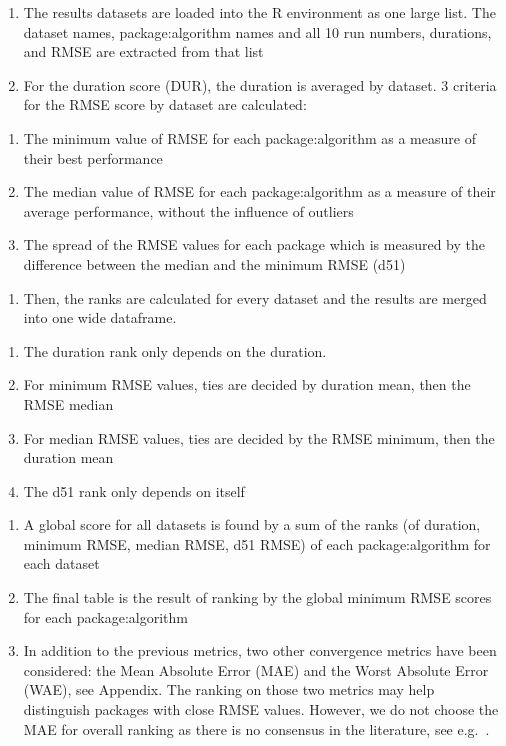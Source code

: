 \begin{enumerate}
\def\labelenumi{\arabic{enumi}.}
\tightlist
\item
  The results datasets are loaded into the R environment as one large
  list. The dataset names, package:algorithm names and all 10 run
  numbers, durations, and RMSE are extracted from that list
\item
  For the duration score (DUR), the duration is averaged by dataset. 3
  criteria for the RMSE score by dataset are calculated:
\end{enumerate}

\begin{enumerate}
\def\labelenumi{\alph{enumi}.}
\tightlist
\item
  The minimum value of RMSE for each package:algorithm as a measure of
  their best performance
\item
  The median value of RMSE for each package:algorithm as a measure of
  their average performance, without the influence of outliers
\item
  The spread of the RMSE values for each package which is measured by
  the difference between the median and the minimum RMSE (d51)
\end{enumerate}

\begin{enumerate}
\def\labelenumi{\arabic{enumi}.}
\setcounter{enumi}{2}
\tightlist
\item
  Then, the ranks are calculated for every dataset and the results are
  merged into one wide dataframe.
\end{enumerate}

\begin{enumerate}
\def\labelenumi{\alph{enumi}.}
\tightlist
\item
  The duration rank only depends on the duration.
\item
  For minimum RMSE values, ties are decided by duration mean, then the
  RMSE median
\item
  For median RMSE values, ties are decided by the RMSE minimum, then the
  duration mean
\item
  The d51 rank only depends on itself
\end{enumerate}

\begin{enumerate}
\def\labelenumi{\arabic{enumi}.}
\setcounter{enumi}{3}
\tightlist
\item
  A global score for all datasets is found by a sum of the ranks (of
  duration, minimum RMSE, median RMSE, d51 RMSE) of each
  package:algorithm for each dataset
\item
  The final table is the result of ranking by the global minimum RMSE
  scores for each package:algorithm
\item
  In addition to the previous metrics, two other convergence metrics
  have been considered: the Mean Absolute Error (MAE) and the Worst
  Absolute Error (WAE), see Appendix. The ranking on those two metrics
  may help distinguish packages with close RMSE values. However, we do
  not choose the MAE for overall ranking as there is no consensus in the
  literature, see e.g.~\citep{willmott2005advantages,chai2014root}.
\end{enumerate}

